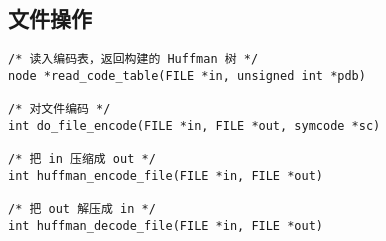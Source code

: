 \subsection{文件操作}

\begin{verbatim}
/* 读入编码表，返回构建的 Huffman 树 */
node *read_code_table(FILE *in, unsigned int *pdb)

/* 对文件编码 */
int do_file_encode(FILE *in, FILE *out, symcode *sc)

/* 把 in 压缩成 out */
int huffman_encode_file(FILE *in, FILE *out)

/* 把 out 解压成 in */
int huffman_decode_file(FILE *in, FILE *out)
\end{verbatim}
